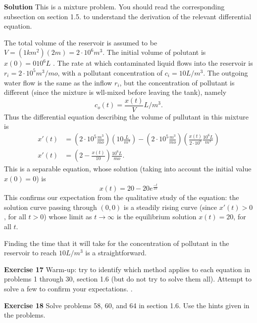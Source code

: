 \documentclass[12pt,oneside]{exam}
\newenvironment{exercise}[1]{\vspace{.1in}\noindent\textbf{Exercise #1 \hspace{.05em}}}{}
\newenvironment{newsolution}{\vspace{.1in}\noindent\textbf{Solution \hspace{.05em}}}{}
\begin{document}
\begin{newsolution}
This is a mixture problem. You should read the corresponding subsection on section 1.5. to understand the derivation of the relevant differential equation. 

The total volume of the reservoir is assumed to be $V = (1km^2)(2m) = 2\cdot10^6 m^3$. The initial volume of polutant is $x(0)=0 10^6 L$ .  The  rate at which contaminated liquid flows into the reservoir is $r_i= 2\cdot 10^5 m^3/mo$, with a pollutant concentration of $c_i = 10L/m^3$. The outgoing  water flow is the same as the inflow $r_i$, but the concentration of pollutant is different (since the mixture is wll-mixed before leaving the tank), namely
\begin{equation*}
c_o(t) = \frac{x(t)}{V} L/m^3.
\end{equation*}
Thus the differential equation describing the volume of pullutant in this mixture is 
\begin{align}
\nonumber 
x'(t) & =\left(2\cdot 10^5\frac{m^3}{mo}\right) \left(10 \frac{L}{m^3}\right) - \left(2\cdot 10^5 \frac{m^3}{mo}\right)
\left(\frac{x(t)}{2\cdot 10^6} \frac{10^6 L}{m^3}\right) \\
\label{mixture_equation}
x'(t) & =\left( 2 - \frac{x(t)}{10}\right) \frac{10^6 L}{mo}.
\end{align}
This is a separable equation, whose solution (taking into account the initial value $x(0)=0$) is 
\begin{equation*}
x(t)=20 - 20e^{\frac{-t}{10}}
\end{equation*}
This confirms our expectation from the qualitative study of the equation: the solution curve passing through $(0,0)$ is a steadily rising curve (since $x'(t)>0$, for all $t>0$) whose limit as $t \to \infty$ is the equilibrium solution $x(t)=20$, for all $t$. 

Finding the time that it will take for the concentration of pollutant in the reservoir to reach $10L/m^3$ is a straightforward.
\end{newsolution}

\begin{exercise}{17}
Warm-up: try to identify which method applies to each equation in problems 1 through 30, section 1.6 (but do not try to solve them all). Attempt to solve a few to confirm your expectations. 
\end{exercise}.

\begin{exercise}{18}
Solve problems 58, 60, and 64 in section 1.6. Use the hints given in the problems. 
\end{exercise}
\end{document}

